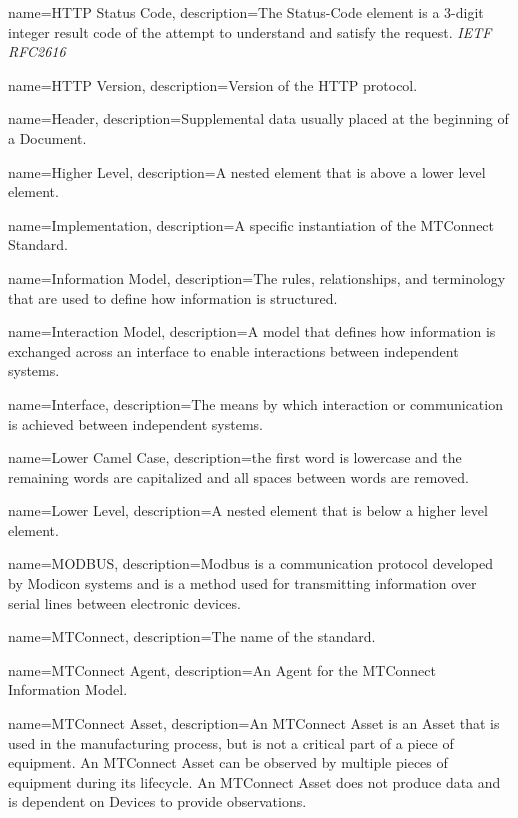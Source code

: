 {
    name={HTTP Status Code},
	description={The Status-Code element is a 3-digit integer result code of the attempt to understand and satisfy the request.  \textit{IETF RFC2616}}
}

{
    name={HTTP Version},
	description={Version of the HTTP protocol.}
}

{
    name={Header},
	description={Supplemental data usually placed at the beginning of a \gls{Document}.}
}

{
    name={Higher Level},
	description={A nested element that is above a lower level element.}
}

{
    name={Implementation},
	description={A specific instantiation of the MTConnect Standard.}
}

{
    name={Information Model},
	description={The rules, relationships, and terminology that are used to define how information is structured.}
}

{
    name={Interaction Model},
	description={A model that deﬁnes how information is exchanged across an interface to enable interactions between independent systems.}
}

{
    name={Interface},
	description={The means by which interaction or communication is achieved between independent systems.}
}

{
    name={Lower Camel Case},
	description={the first word is lowercase and the remaining words are capitalized and all spaces between words are removed.}
}

{
    name={Lower Level},
	description={A nested element that is below a higher level element.}
}

{
    name={MODBUS},
	description={Modbus is a communication protocol developed by Modicon systems and is a method used for transmitting information over serial lines between electronic devices.}
}

{
    name={MTConnect},
	description={The name of the standard.}
}

{
    name={MTConnect Agent},
	description={An \gls{Agent} for the \gls{MTConnect Information Model}.}
}

{
    name={MTConnect Asset},
	description={An \gls{MTConnect Asset} is an \gls{Asset} that is used in the manufacturing process, but is not a critical part of a piece of equipment. An \gls{MTConnect Asset} can be observed by multiple pieces of equipment during its lifecycle.
An \gls{MTConnect Asset} does not produce data and is dependent on \glspl{Device} to provide \glspl{observation}.
}
}

